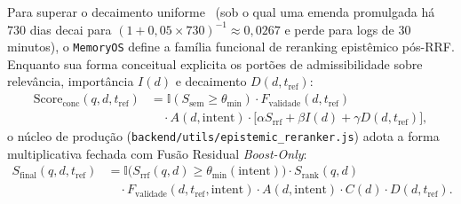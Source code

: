 \documentclass[10pt,twocolumn]{article}
\begin{document}
Para superar o decaimento uniforme~\cite{E08} (sob o qual uma emenda promulgada h\'a $730$ dias decai para $(1 + 0{,}05 \times 730)^{-1} \approx 0{,}0267$ e perde para logs de $30$ minutos), o \texttt{MemoryOS} define a fam\'ilia funcional de reranking epist\^emico p\'os-RRF. Enquanto sua forma conceitual explicita os port\~oes de admissibilidade sobre relev\^ancia, import\^ancia $I(d)$ e decaimento $D(d, t_{\mathrm{ref}})$:
\begin{equation}
\begin{aligned}
\mathrm{Score}_{\mathrm{conc}}(q,d,t_{\mathrm{ref}}) &= \mathbb{I}(S_{\mathrm{sem}} \ge \theta_{\min}) \cdot F_{\mathrm{validade}}(d, t_{\mathrm{ref}}) \\
&\quad \cdot A(d, \mathrm{intent}) \cdot \bigl[\alpha S_{\mathrm{rrf}} + \beta I(d) + \gamma D(d, t_{\mathrm{ref}})\bigr],
\end{aligned}
\end{equation}
o n\'ucleo de produ\c{c}\~ao (\texttt{backend/utils/epistemic\_reranker.js}) adota a forma multiplicativa fechada com Fus\~ao Residual \emph{Boost-Only}:
\begin{equation}
\begin{aligned}
S_{\mathrm{final}}(q,d,t_{\mathrm{ref}}) &= \mathbb{I}\!\bigl(S_{\mathrm{rrf}}(q,d) \ge \theta_{\min}(\mathrm{intent})\bigr) \cdot S_{\mathrm{rank}}(q,d) \\
&\quad \cdot F_{\mathrm{validade}}(d, t_{\mathrm{ref}}, \mathrm{intent}) \cdot A(d, \mathrm{intent}) \cdot C(d) \cdot D(d, t_{\mathrm{ref}}).
\end{aligned}
\end{equation}
\end{document}
